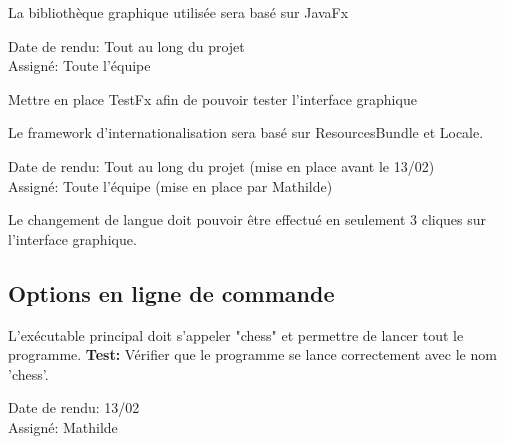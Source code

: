\documentclass{article}
\begin{document}
\begin{nonfunctionnalneedbox}
    La bibliothèque graphique utilisée sera basé sur JavaFx
    \begin{duedatebox}
        Date de rendu: Tout au long du projet\\
        Assigné: Toute l'équipe
    \end{duedatebox}
    \begin{subneedbox}
        Mettre en place TestFx afin de pouvoir tester l'interface graphique
    \end{subneedbox}
\end{nonfunctionnalneedbox}

\begin{nonfunctionnalneedbox}[F13: Internationalisation]
    Le framework d'internationalisation sera basé sur ResourcesBundle et Locale.
    \begin{duedatebox}
        Date de rendu: Tout au long du projet (mise en place avant le 13/02)\\
        Assigné: Toute l'équipe (mise en place par Mathilde)
    \end{duedatebox}
    \begin{subneedbox}
        Le changement de langue doit pouvoir être effectué en seulement 3 cliques
        sur l'interface graphique.
    \end{subneedbox}
\end{nonfunctionnalneedbox}

\subsection{Options en ligne de commande}

\begin{nonfunctionnalneedbox}
    L’exécutable principal doit s’appeler "chess" et permettre de lancer tout le programme.
    \textbf{Test:} Vérifier que le programme se lance correctement avec le nom 'chess'.
    \begin{duedatebox}
        Date de rendu: 13/02\\
        Assigné: Mathilde
    \end{duedatebox}
\end{nonfunctionnalneedbox}
\end{document}
